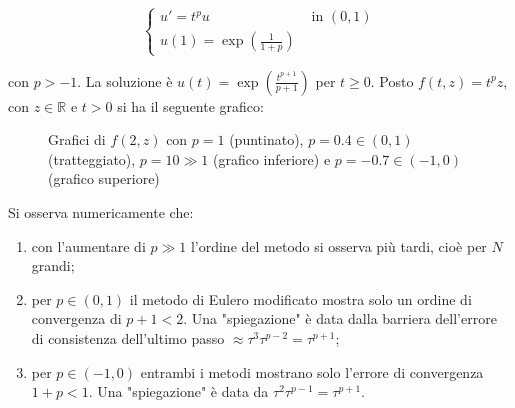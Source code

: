 \documentclass[hidelinks, 10pt]{report}
\begin{document}
\[
\begin{cases}
u' = t^{p} u & \text{ in } (0, 1) \\
u(1) = \exp \left( \frac{1}{1 + p} \right) 
\end{cases}
\]

con $ p > -1 $. La soluzione \`e $ u(t) = \exp \left( \frac{t^{p + 1}}{p + 1} \right) $ per $ t \ge 0 $. Posto $ f(t, z) = t^{p} z $, con $ z \in \mathbb{R} $ e $ t > 0 $ si ha il seguente grafico:

\begin{figure}[H]
\begin{center}

\caption{Grafici di $ f(2, z) $ con $ p = 1 $ (puntinato), $ p = 0.4 \in (0, 1) $ (tratteggiato), $ p = 10 \gg 1 $ (grafico inferiore) e $ p = -0.7 \in (-1, 0) $ (grafico superiore)}
\end{center}
\end{figure}

Si osserva numericamente che:
\begin{enumerate}
\item con l'aumentare di $ p \gg 1 $ l'ordine del metodo si osserva pi\`u tardi, cio\`e per $ N $ grandi;
\item per $ p \in (0, 1) $ il metodo di Eulero modificato mostra solo un ordine di convergenza di $ p + 1 < 2 $. Una "spiegazione" \`e data dalla barriera dell'errore di consistenza dell'ultimo passo $ \approx \tau^{3} \tau^{p - 2} = \tau^{p + 1} $;
\item per $ p \in (-1, 0) $ entrambi i metodi mostrano solo l'errore di convergenza $ 1 + p < 1 $. Una "spiegazione" \`e data da $ \tau^{2} \tau^{p - 1} = \tau^{p + 1} $.
\end{enumerate}

% 
%
\end{document}

